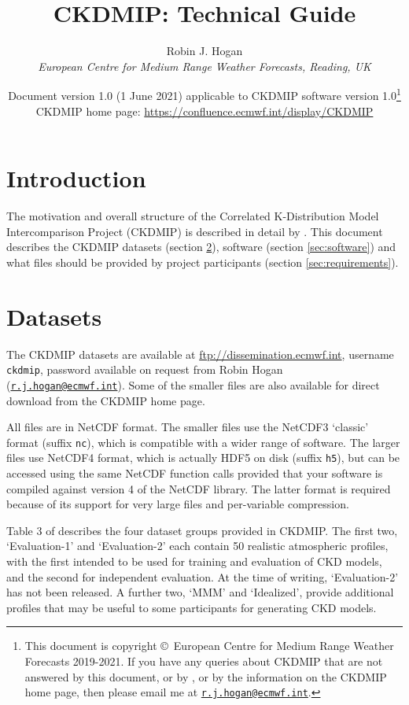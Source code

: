 \documentclass[twoside]{article}
\title{CKDMIP: Technical Guide}
\author{Robin J. Hogan\\ \emph{European Centre for Medium Range
    Weather Forecasts, Reading, UK}}
\date{\normalsize Document version 1.0 (1 June 2021) applicable to CKDMIP
  software version 1.0\thanks{This document is copyright
    \copyright\ European Centre for Medium Range Weather Forecasts
    2019-2021. If you have any queries about CKDMIP that are not answered
    by this document, or by \cite{Hogan+2020}, or by the information
    on the CKDMIP home page, then please email me at
    \href{mailto:r.j.hogan@ecmwf.int}{\texttt{r.j.hogan@ecmwf.int}}.}\\
  CKDMIP home page: \url{https://confluence.ecmwf.int/display/CKDMIP}}
\def\codesize{\small}
\def\code#1{{\codesize\texttt{#1}}}
\renewcommand\thefootnote{\relax}
\begin{document}
\maketitle

\def\thefootnote{\fnsymbol{footnote}}
\section{Introduction}
The motivation and overall structure of the Correlated K-Distribution
Model Intercomparison Project (CKDMIP) is described in detail by
\cite{Hogan+2020}.  This document describes the CKDMIP datasets
(section \ref{sec:datasets}), software (section \ref{sec:software})
and what files should be provided by project participants (section
\ref{sec:requirements}).

\section{Datasets}
\label{sec:datasets}
The CKDMIP datasets are available at \url{ftp://dissemination.ecmwf.int},
username \code{ckdmip}, password available on request from Robin Hogan
(\href{mailto:r.j.hogan@ecmwf.int}{\texttt{r.j.hogan@ecmwf.int}}).
Some of the smaller files are also available for direct download from
the CKDMIP home page.

All files are in NetCDF format.  The smaller files use the NetCDF3
`classic' format (suffix \code{nc}), which is compatible with a wider
range of software.  The larger files use NetCDF4 format, which is
actually HDF5 on disk (suffix \code{h5}), but can be accessed using
the same NetCDF function calls provided that your software is compiled
against version 4 of the NetCDF library. The latter format is required
because of its support for very large files and per-variable
compression.

Table 3 of \cite{Hogan+2020} describes the four dataset groups
provided in CKDMIP.  The first two, `Evaluation-1' and `Evaluation-2'
each contain 50 realistic atmospheric profiles, with the first
intended to be used for training and evaluation of CKD models, and the
second for independent evaluation. At the time of writing,
`Evaluation-2' has not been released. A further two, `MMM' and
`Idealized', provide additional profiles that may be useful to some
participants for generating CKD models.
\end{document}
